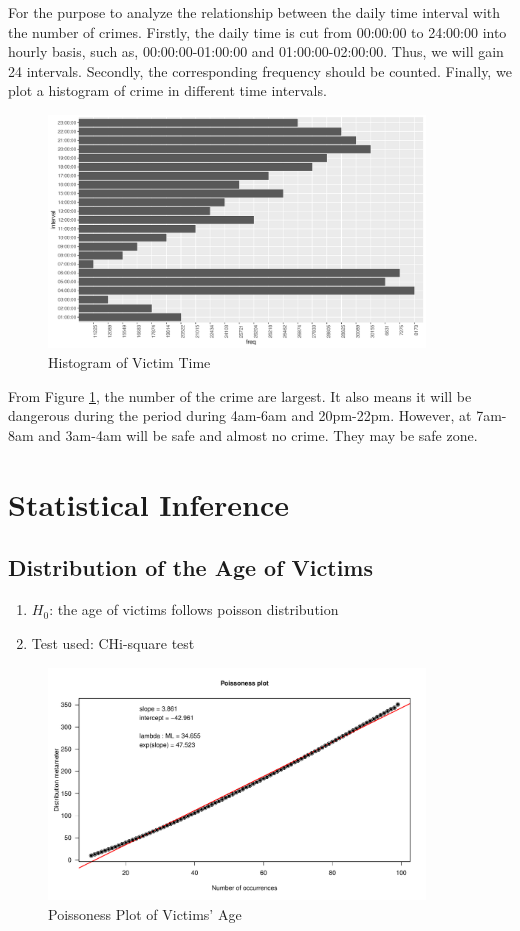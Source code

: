 \documentclass[UTF8]{article}
\begin{document}
For the purpose to analyze the relationship between the daily time interval with the number of crimes. Firstly, the daily time is cut from 00:00:00 to 24:00:00 into hourly basis, such as, 00:00:00-01:00:00 and 01:00:00-02:00:00. Thus, we will gain 24 intervals. Secondly, the corresponding frequency should be counted. Finally, we plot a histogram of crime in different time intervals.

\begin{figure}[htb]
    \includegraphics[width=10cm,height=6.18cm]{../image/2.pdf}
    \caption{Histogram of Victim Time}\label{fig:Victim_time} 
\end{figure}

From Figure \ref{fig:Victim_time}, the number of the crime are largest. It also means it will be dangerous during the period during 4am-6am and 20pm-22pm. However, at 7am-8am and 3am-4am will be safe and almost no crime. They may be safe zone.


\section{Statistical Inference}

\subsection{Distribution of the Age of Victims}

\begin{enumerate}[-]
    \item $H_0$: the age of victims follows poisson distribution
    \item Test used: CHi-square test
\end{enumerate}


\begin{figure}[htb]
    \includegraphics[width=10cm,height=6.18cm]{../image/3.pdf}
    \caption{Poissoness Plot of Victims' Age}\label{fig:poisson_Victim_age} 
\end{figure}
\end{document}
